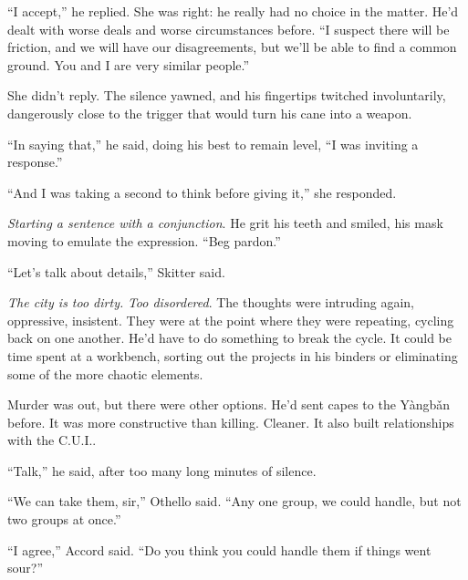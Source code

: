 ``I accept,'' he replied.  She was right: he really had no choice in the matter.  He'd dealt with worse deals and worse circumstances before.  ``I suspect there will be friction, and we will have our disagreements, but we'll be able to find a common ground.  You and I are very similar people.''



She didn't reply.  The silence yawned, and his fingertips twitched involuntarily, dangerously close to the trigger that would turn his cane into a weapon.



``In saying that,'' he said, doing his best to remain level, ``I was inviting a response.''



``And I was taking a second to think before giving it,'' she responded.



\emph{Starting a sentence with a conjunction}.  He grit his teeth and smiled, his mask moving to emulate the expression.  ``Beg pardon.''



``Let's talk about details,'' Skitter said.



\sectionbreak



\emph{The city is too dirty. }\emph{Too disordered}.  The thoughts were intruding again, oppressive, insistent.  They were at the point where they were repeating, cycling back on one another.  He'd have to do something to break the cycle.  It could be time spent at a workbench, sorting out the projects in his binders or eliminating some of the more chaotic elements.



Murder was out, but there were other options.  He'd sent capes to the Y\`{a}ngb\v{a}n before.  It was more constructive than killing.  Cleaner.  It also built relationships with the C.U.I..



``Talk,'' he said, after too many long minutes of silence.



``We can take them, sir,'' Othello said.  ``Any one group, we could handle, but not two groups at once.''



``I agree,'' Accord said.  ``Do you think you could handle them if things went sour?''



